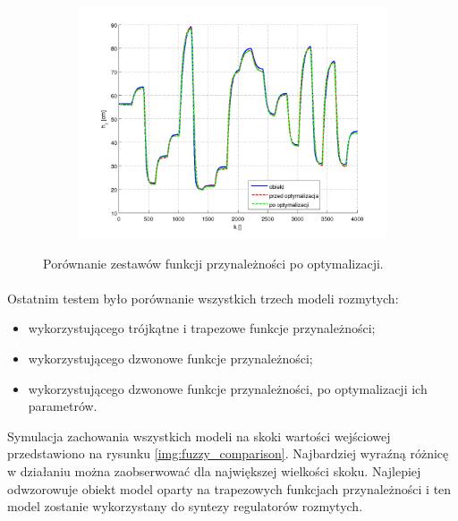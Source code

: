 \documentclass[a4paper,12pt]{article}
\begin{document}
\newpage
\begin{figure}[h]
   \centering
   \begin{subfigure}[h]{0.45\textwidth}
      \includegraphics[width=\textwidth]{img/trajectories.png}
   \end{subfigure}
   \caption{Porównanie zestawów funkcji przynależności po optymalizacji.}
   \label{img:trajectories}
\end{figure}

\paragraph{}
Ostatnim testem było porównanie wszystkich trzech modeli rozmytych:
\begin{itemize}
   \item wykorzystującego trójkątne i trapezowe funkcje przynależności;
   \item wykorzystującego dzwonowe funkcje przynależności;
   \item wykorzystującego dzwonowe funkcje przynależności, po optymalizacji ich parametrów.
\end{itemize}
\noindent Symulacja zachowania wszystkich modeli na skoki wartości wejściowej przedstawiono na rysunku \ref{img:fuzzy_comparison}.
Najbardziej wyraźną różnicę w działaniu można zaobserwować dla największej wielkości skoku.
Najlepiej odwzorowuje obiekt model oparty na trapezowych funkcjach przynależności i ten model zostanie wykorzystany do syntezy regulatorów rozmytych.
\end{document}
